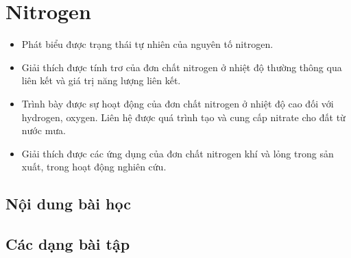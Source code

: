 \section{Nitrogen}
\begin{Muctieu}
	\begin{itemize}
		\item  Phát biểu được trạng thái tự nhiên của nguyên tố nitrogen.
		\item  Giải thích được tính trơ của đơn chất nitrogen ở nhiệt độ thường thông qua liên kết và giá trị năng lượng liên kết.
		\item  Trình bày được sự hoạt động của đơn chất nitrogen ở nhiệt độ cao đối với hydrogen, oxygen. Liên hệ được quá trình tạo và cung cấp nitrate cho đất từ nước mưa.
		\item  Giải thích được các ứng dụng của đơn chất nitrogen khí và lỏng trong sản xuất, trong hoạt động nghiên cứu.
	\end{itemize}
\end{Muctieu}
\subsection{Nội dung bài học}

\subsection{Các dạng bài tập}

